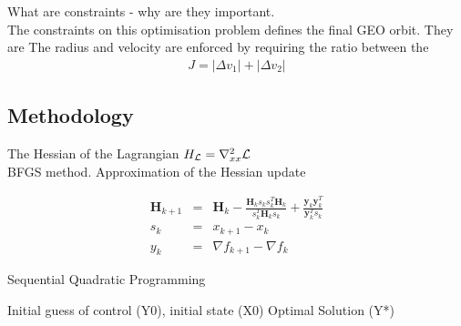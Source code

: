 \documentclass[Space3_Assign3.tex]{subfile}
\begin{document}
What are constraints - why are they important.\\
The constraints on this optimisation problem defines the final GEO orbit. They are  The radius and velocity are enforced by requiring the ratio between the 
\begin{eqnarray}
J = |\Delta v_1 | + |\Delta v_2| \label{costfn}
\end{eqnarray}

\subsection{}




\subsection{Methodology}






The Hessian of the Lagrangian $H_{\mathcal{L}} = \nabla^2_{xx}\mathcal{L}$\\
BFGS method. Approximation of the Hessian update

\begin{eqnarray}
\bm{H}_{k+1} &=& \bm{H}_k - \frac{\bm{H}_k s_k s_k^T \bm{H}_k}{s_k^T \bm{H}_k s_k} + \frac{\bm{y}_k\bm{y}_k^T}{\bm{y}_k^T s_k}\\
s_k &=& x_{k+1} - x_k\\
y_k &=& \nabla f_{k+1} - \nabla f_k
\end{eqnarray}

\begin{algorithm}
\caption{Sequential Quadratic Programming} \label{PC:SQR}
\begin{algorithmic}
 Initial guess of control (Y0), initial state (X0)
 Optimal Solution (Y*)

\end{algorithmic}
\end{algorithm}
\end{document}
